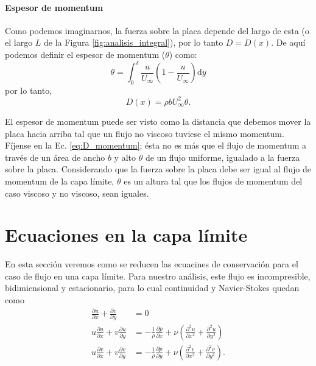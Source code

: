 \paragraph*{Espesor de momentum}
Como podemos imaginarnos, la fuerza sobre la placa depende del largo de esta (o el largo $L$ de la Figura \ref{fig:analisis_integral}), por lo tanto $D=D(x)$.
De aquí podemos definir el espesor de momentum ($\theta$) como:
%
\begin{equation}\label{eq:espesor_momentum}
\theta = \int_0^\delta \frac{u}{U_\infty}\left(1-\frac{u}{U_\infty}\right)\mathrm{d}y
\end{equation}
%
por lo tanto,
%
\begin{equation}\label{eq:D_momentum}
D(x) = \rho b U_\infty^2\theta.
\end{equation}

El espesor de momentum puede ser visto como la distancia que debemos mover la placa hacia arriba tal que un flujo no viscoso tuviese el mismo momentum.
Fíjense en la Ec. \eqref{eq:D_momentum}; ésta no es más que el flujo de momentum a través de un área de ancho $b$ y alto $\theta$ de un flujo uniforme, igualado a la fuerza sobre la placa.
Considerando que la fuerza sobre la placa debe ser igual al flujo de momentum de la capa límite, $\theta$ es un altura tal que los flujos de momentum del caso viscoso y no viscoso, sean iguales.

\section*{Ecuaciones en la capa límite}
En esta sección veremos como se reducen las ecuacines de conservación para el caso de flujo en una capa límite.
Para nuestro análisis, este flujo es incompresible, bidimiensional y estacionario, para lo cual continuidad y Navier-Stokes quedan como
%
\begin{align}\label{eq:NS_capa}
\frac{\partial u}{\partial x} + \frac{\partial v}{\partial y} &= 0 \nonumber\\
u\frac{\partial u}{\partial x} + v\frac{\partial u}{\partial y} &= -\frac{1}{\rho}\frac{\partial p}{\partial x} + \nu\left( \frac{\partial^2u}{\partial x^2} + \frac{\partial^2u}{\partial y^2}\right) \nonumber\\
u\frac{\partial v}{\partial x} + v\frac{\partial v}{\partial y} &= -\frac{1}{\rho}\frac{\partial p}{\partial y} + \nu\left( \frac{\partial^2v}{\partial x^2} + \frac{\partial^2v}{\partial y^2}\right).
\end{align}


